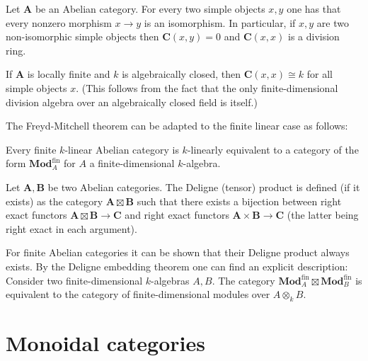     \begin{theorem}
        Let $\mathbf{A}$ be an Abelian category. For every two simple objects $x,y$ one has that every nonzero morphism $x\rightarrow y$ is an isomorphism. In particular, if $x,y$ are two non-isomorphic simple objects then $\mathbf{C}(x, y)=0$ and $\mathbf{C}(x, x)$ is a division ring.
    \end{theorem}
    \begin{result}
        If $\mathbf{A}$ is locally finite and $k$ is algebraically closed, then $\mathbf{C}(x, x)\cong k$ for all simple objects $x$. (This follows from the fact that the only finite-dimensional division algebra over an algebraically closed field is itself.)
    \end{result}

    The Freyd-Mitchell theorem can be adapted to the finite linear case as follows:
    \begin{theorem}[Deligne]
        Every finite $k$-linear Abelian category is $k$-linearly equivalent to a category of the form $\mathbf{Mod}_A^{\text{fin}}$ for $A$ a finite-dimensional $k$-algebra.
    \end{theorem}

    \begin{construct}
        Let $\mathbf{A}, \mathbf{B}$ be two Abelian categories. The Deligne (tensor) product is defined (if it exists) as the category $\mathbf{A}\boxtimes\mathbf{B}$ such that there exists a bijection between right exact functors $\mathbf{A}\boxtimes\mathbf{B}\rightarrow\mathbf{C}$ and right exact functors $\mathbf{A}\times\mathbf{B}\rightarrow\mathbf{C}$ (the latter being right exact in each argument).

        For finite Abelian categories it can be shown that their Deligne product always exists. By the Deligne embedding theorem one can find an explicit description: Consider two finite-dimensional $k$-algebras $A, B$. The category $\mathbf{Mod}_A^{\text{fin}}\boxtimes\mathbf{Mod}_B^{\text{fin}}$ is equivalent to the category of finite-dimensional modules over $A\otimes_kB$.
    \end{construct}

\section{Monoidal categories}


